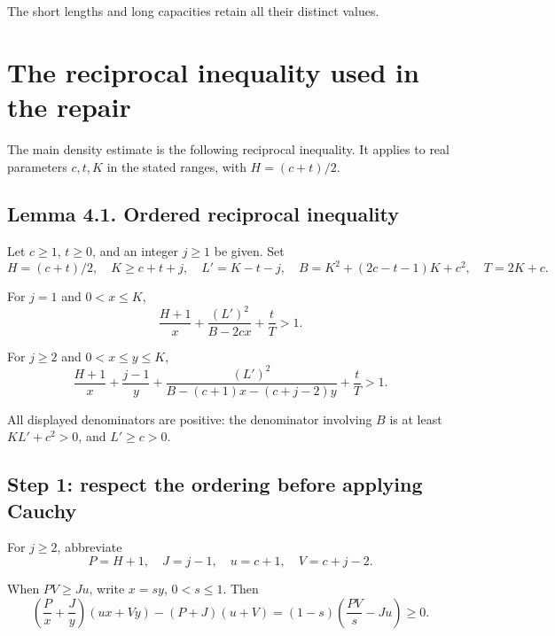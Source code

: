 \documentclass[11pt,a4paper]{article}
\begin{document}
The short lengths and long capacities retain all their distinct values.

\hypertarget{the-reciprocal-inequality-used-in-the-repair}{%
\section{The reciprocal inequality used in the repair}\label{the-reciprocal-inequality-used-in-the-repair}}

The main density estimate is the following reciprocal inequality. It applies to real parameters \(c,t,K\) in the stated ranges, with \(H=(c+t)/2\).

\hypertarget{lemma-4.1.-ordered-reciprocal-inequality}{%
\subsection*{Lemma 4.1. Ordered reciprocal inequality}\label{lemma-4.1.-ordered-reciprocal-inequality}}

Let \(c\ge1\), \(t\ge0\), and an integer \(j\ge1\) be given. Set
\[
H=(c+t)/2,\quad K\ge c+t+j,\quad L'=K-t-j,
\quad B=K^2+(2c-t-1)K+c^2,\quad T=2K+c.
\]

For \(j=1\) and \(0<x\le K\),
\begin{equation}
\frac{H+1}{x}+\frac{(L')^2}{B-2cx}+\frac tT>1.
\tag{4.1}
\label{eq:4.1}
\end{equation}

For \(j\ge2\) and \(0<x\le y\le K\),
\begin{equation}
\frac{H+1}{x}+\frac{j-1}{y}
+\frac{(L')^2}{B-(c+1)x-(c+j-2)y}
+\frac tT>1.
\tag{4.2}
\label{eq:4.2}
\end{equation}

All displayed denominators are positive: the denominator involving \(B\) is at least \(KL'+c^2>0\), and \(L'\ge c>0\).

\hypertarget{step-1-respect-the-ordering-before-applying-cauchy}{%
\subsection*{Step 1: respect the ordering before applying Cauchy}\label{step-1-respect-the-ordering-before-applying-cauchy}}

For \(j\ge2\), abbreviate
\[
P=H+1,\quad J=j-1,\quad u=c+1,\quad V=c+j-2.
\]

When \(PV\ge Ju\), write \(x=s y\), \(0<s\le1\). Then
\[
\left(\frac P x+\frac J y\right)(ux+Vy)
 -(P+J)(u+V)
=(1-s)\left(\frac{PV}{s}-Ju\right)\ge0.
\]
\end{document}
